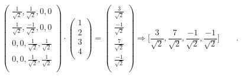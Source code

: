 \begin{frame}
{		\begin{equation*}
			\begin{pmatrix}
			\frac{1}{\sqrt{2}}, \frac{1}{\sqrt{2}}, 0, 0\\
			\frac{1}{\sqrt{2}}, \frac{-1}{\sqrt{2}}, 0, 0\\
			0, 0, \frac{1}{\sqrt{2}}, \frac{1}{\sqrt{2}}\\
			0, 0, \frac{1}{\sqrt{2}}, \frac{1}{\sqrt{2}}\\
			\end{pmatrix} 
			\cdot
			\begin{pmatrix}
			1\\
			2\\
			3\\
			4\\
			\end{pmatrix} 
			=
			\begin{pmatrix}
			\frac{3}{\sqrt{2}}\\
			\frac{-1}{\sqrt{2}}\\
			\frac{7}{\sqrt{2}}\\
			\frac{-1}{\sqrt{2}}\\
			\end{pmatrix}
			\Rightarrow \Big[
			\frac{3}{\sqrt{2}},
			\frac{7}{\sqrt{2}},
			\frac{-1}{\sqrt{2}},
			\frac{-1}{\sqrt{2}}
			\Big]\qquad.
		\end{equation*}
	}

\end{frame}







